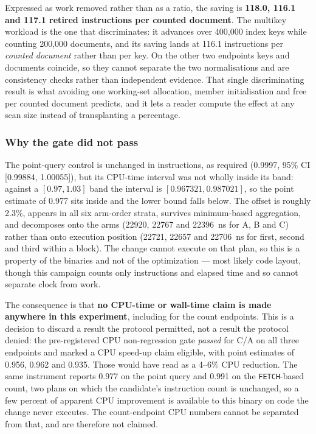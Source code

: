 \documentclass[10pt]{article}
\newcommand{\code}[1]{\texttt{#1}}
\begin{document}
Expressed as work removed rather than as a ratio, the saving is \textbf{118.0,
116.1 and 117.1 retired instructions per counted document}. The multikey
workload is the one that discriminates: it advances over 400{,}000 index keys
while counting 200{,}000 documents, and its saving lands at 116.1 instructions
per \emph{counted document} rather than per key. On the other two endpoints keys
and documents coincide, so they cannot separate the two normalisations and are
consistency checks rather than independent evidence. That single discriminating
result is what avoiding one working-set allocation, member initialisation and
free per counted document predicts, and it lets a reader compute the effect at
any scan size instead of transplanting a percentage.

\subsubsection{Why the gate did not pass}

The point-query control is unchanged in instructions, as required
(0.9997, 95\% CI [0.99884, 1.00055]), but its CPU-time interval was not wholly
inside its band: against a $[0.97, 1.03]$ band the interval is
$[0.967321, 0.987021]$, so the point estimate of 0.977 sits inside and the lower
bound falls below. The offset is roughly 2.3\%, appears in all six arm-order
strata, survives minimum-based aggregation, and decomposes onto the arms
(22920, 22767 and 22396~ns for A, B and C) rather than onto execution position
(22721, 22657 and 22706~ns for first, second and third within a block). The
change cannot execute on that plan, so this is a property of the binaries and
not of the optimization --- most likely code layout, though this campaign counts
only instructions and elapsed time and so cannot separate clock from work.

The consequence is that \textbf{no CPU-time or wall-time claim is made anywhere
in this experiment}, including for the count endpoints. This is a decision to
discard a result the protocol permitted, not a result the protocol denied: the
pre-registered CPU non-regression gate \emph{passed} for C/A on all three
endpoints and marked a CPU speed-up claim eligible, with point estimates of
0.956, 0.962 and 0.935. Those would have read as a 4--6\% CPU reduction. The
same instrument reports 0.977 on the point query and 0.991 on the
\code{FETCH}-based count, two plans on which the candidate's instruction count
is unchanged, so a few percent of apparent CPU improvement is available to this
binary on code the change never executes. The count-endpoint CPU numbers cannot
be separated from that, and are therefore not claimed.
\end{document}

